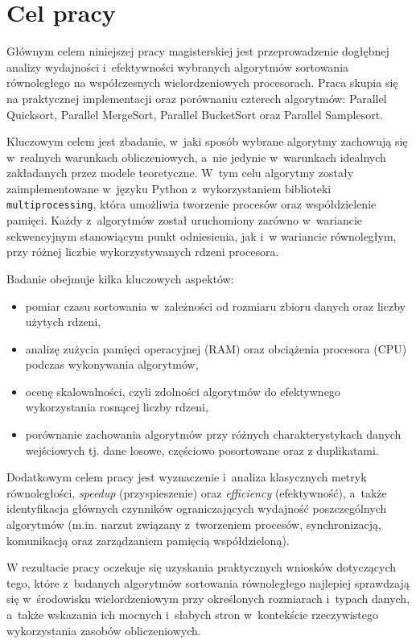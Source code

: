 \section*{Cel pracy}

Głównym celem niniejszej pracy magisterskiej jest przeprowadzenie dogłębnej analizy wydajności i~efektywności wybranych algorytmów 
sortowania równoległego na współczesnych wielordzeniowych procesorach. Praca skupia się na praktycznej implementacji oraz 
porównaniu czterech algorytmów: Parallel Quicksort, Parallel MergeSort, Parallel BucketSort oraz Parallel Samplesort.

Kluczowym celem jest zbadanie, w~jaki sposób wybrane algorytmy zachowują się w~realnych warunkach obliczeniowych, a~nie 
jedynie w~warunkach idealnych zakładanych przez modele teoretyczne. W~tym celu algorytmy zostały zaimplementowane w~języku 
Python z~wykorzystaniem biblioteki \texttt{multiprocessing}, która umożliwia tworzenie procesów oraz współdzielenie pamięci. 
Każdy z~algorytmów został uruchomiony zarówno w~wariancie sekwencyjnym stanowiącym punkt odniesienia, jak i~w wariancie równoległym, 
przy różnej liczbie wykorzystywanych rdzeni procesora.

Badanie obejmuje kilka kluczowych aspektów:

\begin{itemize}
    \item pomiar czasu sortowania w~zależności od rozmiaru zbioru danych oraz liczby użytych rdzeni,
    \item analizę zużycia pamięci operacyjnej (RAM) oraz obciążenia procesora (CPU) podczas wykonywania algorytmów,
    \item ocenę skalowalności, czyli zdolności algorytmów do efektywnego wykorzystania rosnącej liczby rdzeni,
    \item porównanie zachowania algorytmów przy różnych charakterystykach danych wejściowych tj. dane losowe, częściowo posortowane 
    oraz z duplikatami.
\end{itemize}

Dodatkowym celem pracy jest wyznaczenie i~analiza klasycznych metryk równoległości, \textit{speedup} (przyspieszenie) oraz 
\textit{efficiency} (efektywność), a~także identyfikacja głównych czynników ograniczających wydajność poszczególnych algorytmów 
(m.in. narzut związany z~tworzeniem procesów, synchronizacją, komunikacją oraz zarządzaniem pamięcią współdzieloną).

W rezultacie pracy oczekuje się uzyskania praktycznych wniosków dotyczących tego, które z~badanych algorytmów sortowania równoległego 
najlepiej sprawdzają się w~środowisku wielordzeniowym przy określonych rozmiarach i~typach danych, a~także wskazania ich mocnych 
i~słabych stron w~kontekście rzeczywistego wykorzystania zasobów obliczeniowych.


